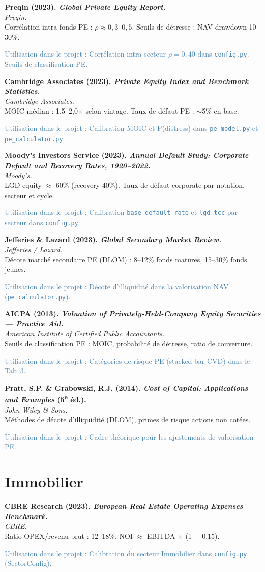 \documentclass[12pt,a4paper]{article}
\newcommand{\bibentry}[4]{%
  \noindent\textbf{#1}\\
  \textit{#2}\\
  #3\par
  \textcolor{steelblue}{\footnotesize\textsf{Utilisation dans le projet :} #4}\par
  \medskip
}
\begin{document}
\bibentry{Preqin (2023). \emph{Global Private Equity Report.}}{Preqin.}{Corrélation intra-fonds PE : $\rho \approx 0{,}3$--$0{,}5$. Seuils de détresse : NAV drawdown 10--30\%.}{Corrélation intra-secteur $\rho = 0{,}40$ dans \texttt{config.py}. Seuils de classification PE.}

\bibentry{Cambridge Associates (2023). \emph{Private Equity Index and Benchmark Statistics.}}{Cambridge Associates.}{MOIC médian : 1,5--2,0$\times$ selon vintage. Taux de défaut PE : $\sim$5\% en base.}{Calibration MOIC et P(distress) dans \texttt{pe\_model.py} et \texttt{pe\_calculator.py}.}

\bibentry{Moody's Investors Service (2023). \emph{Annual Default Study: Corporate Default and Recovery Rates, 1920--2022.}}{Moody's.}{LGD equity $\approx$ 60\% (recovery 40\%). Taux de défaut corporate par notation, secteur et cycle.}{Calibration \texttt{base\_default\_rate} et \texttt{lgd\_tcc} par secteur dans \texttt{config.py}.}

\bibentry{Jefferies \& Lazard (2023). \emph{Global Secondary Market Review.}}{Jefferies / Lazard.}{Décote marché secondaire PE (DLOM) : 8--12\% fonds matures, 15--30\% fonds jeunes.}{Décote d'illiquidité dans la valorisation NAV (\texttt{pe\_calculator.py}).}

\bibentry{AICPA (2013). \emph{Valuation of Privately-Held-Company Equity Securities --- Practice Aid.}}{American Institute of Certified Public Accountants.}{Seuils de classification PE : MOIC, probabilité de détresse, ratio de couverture.}{Catégories de risque PE (stacked bar CVD) dans le Tab~3.}

\bibentry{Pratt, S.P. \& Grabowski, R.J. (2014). \emph{Cost of Capital: Applications and Examples} (5\textsuperscript{e} éd.).}{John Wiley \& Sons.}{Méthodes de décote d'illiquidité (DLOM), primes de risque actions non cotées.}{Cadre théorique pour les ajustements de valorisation PE.}

\section{Immobilier}

\bibentry{CBRE Research (2023). \emph{European Real Estate Operating Expenses Benchmark.}}{CBRE.}{Ratio OPEX/revenu brut : 12--18\%. NOI $\approx$ EBITDA $\times$ (1 $-$ 0,15).}{Calibration du secteur Immobilier dans \texttt{config.py} (SectorConfig).}
\end{document}
